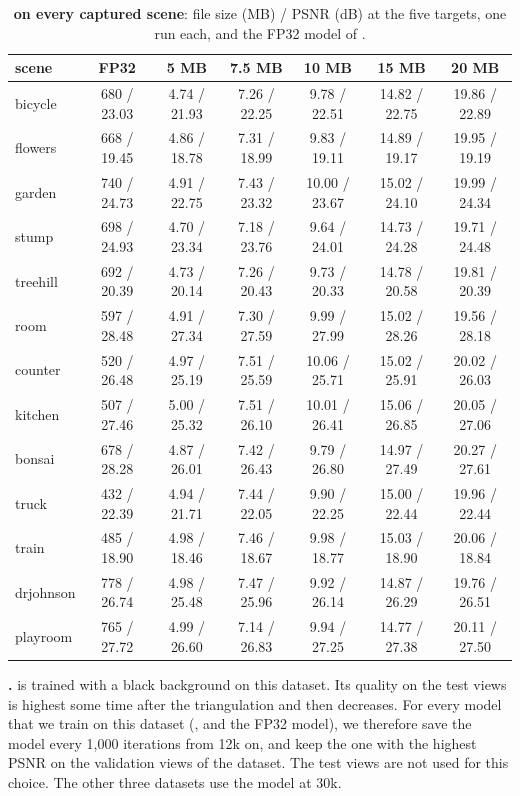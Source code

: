 \begin{table}[!t]\centering\footnotesize
\caption{\textbf{\BM on every captured scene}: file size (MB) / PSNR (dB) at the five targets, one run each, and the FP32 model of \MS.}
\label{sup:tab:perscene}
\begin{tabular}{@{}lcccccc@{}}
\toprule
scene & FP32 & 5 MB & 7.5 MB & 10 MB & 15 MB & 20 MB \\
\midrule
bicycle & 680 / 23.03 & 4.74 / 21.93 & 7.26 / 22.25 & 9.78 / 22.51 & 14.82 / 22.75 & 19.86 / 22.89 \\
flowers & 668 / 19.45 & 4.86 / 18.78 & 7.31 / 18.99 & 9.83 / 19.11 & 14.89 / 19.17 & 19.95 / 19.19 \\
garden & 740 / 24.73 & 4.91 / 22.75 & 7.43 / 23.32 & 10.00 / 23.67 & 15.02 / 24.10 & 19.99 / 24.34 \\
stump & 698 / 24.93 & 4.70 / 23.34 & 7.18 / 23.76 & 9.64 / 24.01 & 14.73 / 24.28 & 19.71 / 24.48 \\
treehill & 692 / 20.39 & 4.73 / 20.14 & 7.26 / 20.43 & 9.73 / 20.33 & 14.78 / 20.58 & 19.81 / 20.39 \\
room & 597 / 28.48 & 4.91 / 27.34 & 7.30 / 27.59 & 9.99 / 27.99 & 15.02 / 28.26 & 19.56 / 28.18 \\
counter & 520 / 26.48 & 4.97 / 25.19 & 7.51 / 25.59 & 10.06 / 25.71 & 15.02 / 25.91 & 20.02 / 26.03 \\
kitchen & 507 / 27.46 & 5.00 / 25.32 & 7.51 / 26.10 & 10.01 / 26.41 & 15.06 / 26.85 & 20.05 / 27.06 \\
bonsai & 678 / 28.28 & 4.87 / 26.01 & 7.42 / 26.43 & 9.79 / 26.80 & 14.97 / 27.49 & 20.27 / 27.61 \\
\midrule
truck & 432 / 22.39 & 4.94 / 21.71 & 7.44 / 22.05 & 9.90 / 22.25 & 15.00 / 22.44 & 19.96 / 22.44 \\
train & 485 / 18.90 & 4.98 / 18.46 & 7.46 / 18.67 & 9.98 / 18.77 & 15.03 / 18.90 & 20.06 / 18.84 \\
\midrule
drjohnson & 778 / 26.74 & 4.98 / 25.48 & 7.47 / 25.96 & 9.92 / 26.14 & 14.87 / 26.29 & 19.76 / 26.51 \\
playroom & 765 / 27.72 & 4.99 / 26.60 & 7.14 / 26.83 & 9.94 / 27.25 & 14.77 / 27.38 & 20.11 / 27.50 \\
\bottomrule
\end{tabular}
\end{table}

\noindent\textbf{\NeRFSyn.} \MS is trained with a black background on this dataset. Its quality on the test views is highest some time after the triangulation and then decreases. For every model that we train on this dataset (\BM, \MSc and the FP32 model), we therefore save the model every 1{,}000 iterations from 12k on, and keep the one with the highest PSNR on the validation views of the dataset. The test views are not used for this choice. The other three datasets use the model at 30k.

